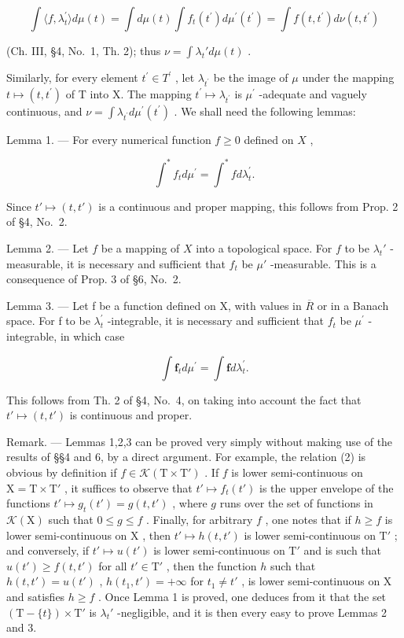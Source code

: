\[
\int \langle f, \lambda_ {t} ^ {\prime} \rangle d \mu (t) = \int d \mu (t) \int f _ {t} (t ^ {\prime}) d \mu^ {\prime} (t ^ {\prime}) = \int f (t, t ^ {\prime}) d \nu (t, t ^ {\prime})
\]

(Ch. III, §4, No.~1, Th. 2); thus \(\nu = \int \lambda_t' d\mu(t)\) .

Similarly, for every element \(t^{\prime} \in T^{\prime}\) , let \(\lambda_{t^{\prime}}\) be the image of \(\mu\) under the mapping \(t \mapsto (t, t^{\prime})\) of T into X. The mapping \(t^{\prime} \mapsto \lambda_{t^{\prime}}\) is \(\mu^{\prime}\) -adequate and vaguely continuous, and \(\nu = \int \lambda_{t^{\prime}} d\mu^{\prime}(t^{\prime})\) . We shall need the following lemmas:

Lemma 1. --- For every numerical function \(f \geqslant 0\) defined on \(X\) ,

\[
\int^ {*} f _ {t} d \mu^ {\prime} = \int^ {*} f d \lambda_ {t} ^ {\prime}.\tag{2}
\]

Since \(t' \mapsto (t, t')\) is a continuous and proper mapping, this follows from Prop. 2 of §4, No.~2.

Lemma 2. --- Let \(f\) be a mapping of \(X\) into a topological space. For \(f\) to be \(\lambda_t'\) -measurable, it is necessary and sufficient that \(f_t\) be \(\mu'\) -measurable. This is a consequence of Prop. 3 of §6, No.~2.

Lemma 3. --- Let f be a function defined on X, with values in \(\overline{R}\) or in a Banach space. For f to be \(\lambda_{t}^{\prime}\) -integrable, it is necessary and sufficient that \(f_{t}\) be \(\mu^{\prime}\) -integrable, in which case

\[
\int \mathbf {f} _ {t} d \mu^ {\prime} = \int \mathbf {f} d \lambda_ {t} ^ {\prime}.\tag{3}
\]

This follows from Th. 2 of §4, No.~4, on taking into account the fact that \(t' \mapsto (t, t')\) is continuous and proper.

Remark. --- Lemmas 1,2,3 can be proved very simply without making use of the results of §§4 and 6, by a direct argument. For example, the relation (2) is obvious by definition if \(f \in \mathcal{K}(\mathrm{T} \times \mathrm{T}')\) . If \(f\) is lower semi-continuous on \(\mathrm{X} = \mathrm{T} \times \mathrm{T}'\) , it suffices to observe that \(t' \mapsto f_t(t')\) is the upper envelope of the functions \(t' \mapsto g_t(t') = g(t, t')\) , where \(g\) runs over the set of functions in \(\mathcal{K}(\mathrm{X})\) such that \(0 \leqslant g \leqslant f\) . Finally, for arbitrary \(f\) , one notes that if \(h \geqslant f\) is lower semi-continuous on \(\mathrm{X}\) , then \(t' \mapsto h(t, t')\) is lower semi-continuous on \(\mathrm{T}'\) ; and conversely, if \(t' \mapsto u(t')\) is lower semi-continuous on \(\mathrm{T}'\) and is such that \(u(t') \geqslant f(t, t')\) for all \(t' \in \mathrm{T}'\) , then the function \(h\) such that \(h(t, t') = u(t')\) , \(h(t_1, t') = +\infty\) for \(t_1 \neq t'\) , is lower semi-continuous on \(\mathrm{X}\) and satisfies \(h \geqslant f\) . Once Lemma 1 is proved, one deduces from it that the set \((\mathrm{T} - \{t\}) \times \mathrm{T}'\) is \(\lambda_t'\) -negligible, and it is then every easy to prove Lemmas 2 and 3.

